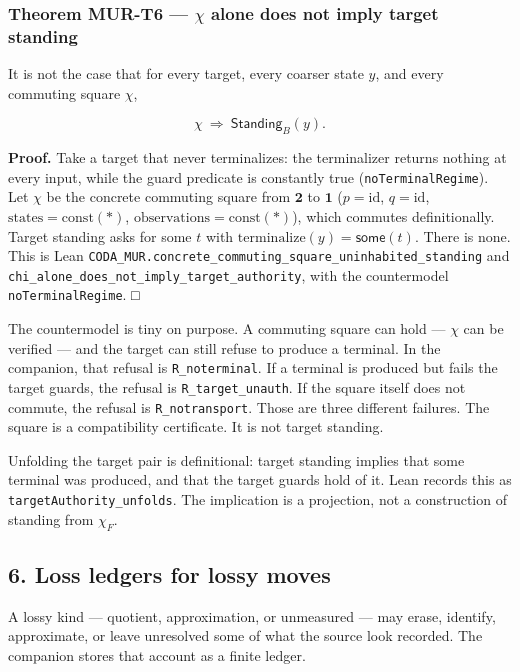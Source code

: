 \documentclass[
  11pt,
]{article}
\begin{document}
\subsubsection{\texorpdfstring{Theorem MUR-T6 --- \(\chi\) alone does not imply target standing}{Theorem MUR-T6 --- \textbackslash chi alone does not imply target standing}}\label{theorem-mur-t6-chi-alone-does-not-imply-target-standing}

It is not the case that for every target, every coarser state \(y\), and every commuting square \(\chi\),

\[
\chi\ \Longrightarrow\ \mathsf{Standing}_B(y).
\]

\textbf{Proof.} Take a target that never terminalizes: the terminalizer returns nothing at every input, while the guard predicate is constantly true (\texttt{noTerminalRegime}). Let \(\chi\) be the concrete commuting square from \(\mathbf{2}\) to \(\mathbf{1}\) (\(p=\mathrm{id}\), \(q=\mathrm{id}\), \(\mathrm{states}=\mathrm{const}(*)\), \(\mathrm{observations}=\mathrm{const}(*)\)), which commutes definitionally. Target standing asks for some \(t\) with \(\mathrm{terminalize}(y)=\mathsf{some}(t)\). There is none. This is Lean \nolinkurl{CODA_MUR.concrete_commuting_square_uninhabited_standing} and \nolinkurl{chi_alone_does_not_imply_target_authority}, with the countermodel \texttt{noTerminalRegime}. □

The countermodel is tiny on purpose. A commuting square can hold --- \(\chi\) can be verified --- and the target can still refuse to produce a terminal. In the companion, that refusal is \texttt{R\_noterminal}. If a terminal is produced but fails the target guards, the refusal is \texttt{R\_target\_unauth}. If the square itself does not commute, the refusal is \texttt{R\_notransport}. Those are three different failures. The square is a compatibility certificate. It is not target standing.

Unfolding the target pair is definitional: target standing implies that some terminal was produced, and that the target guards hold of it. Lean records this as \nolinkurl{targetAuthority_unfolds}. The implication is a projection, not a construction of standing from \(\chi_F\).

\subsection{6. Loss ledgers for lossy moves}\label{loss-ledgers-for-lossy-moves}

A lossy kind --- quotient, approximation, or unmeasured --- may erase, identify, approximate, or leave unresolved some of what the source look recorded. The companion stores that account as a finite ledger.
\end{document}
